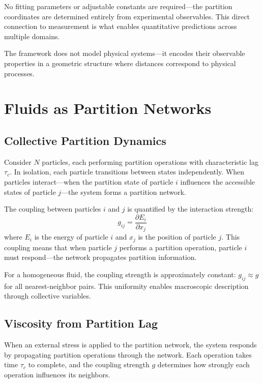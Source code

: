 \documentclass[twocolumn,superscriptaddress,prb,10pt]{revtex4-2}
\begin{document}
No fitting parameters or adjustable constants are required—the partition coordinates are determined entirely from experimental observables. This direct connection to measurement is what enables quantitative predictions across multiple domains.

The framework does not model physical systems—it encodes their observable properties in a geometric structure where distances correspond to physical processes.

\section{Fluids as Partition Networks}
\label{sec:fluids}

\subsection{Collective Partition Dynamics}

Consider $N$ particles, each performing partition operations with characteristic lag $\tau_c$. In isolation, each particle transitions between states independently. When particles interact—when the partition state of particle $i$ influences the accessible states of particle $j$—the system forms a partition network.

The coupling between particles $i$ and $j$ is quantified by the interaction strength:
\begin{equation}
g_{ij} = \frac{\partial E_i}{\partial x_j}
\label{eq:coupling}
\end{equation}
where $E_i$ is the energy of particle $i$ and $x_j$ is the position of particle $j$. This coupling means that when particle $j$ performs a partition operation, particle $i$ must respond—the network propagates partition information.

For a homogeneous fluid, the coupling strength is approximately constant: $g_{ij} \approx g$ for all nearest-neighbor pairs. This uniformity enables macroscopic description through collective variables.

\subsection{Viscosity from Partition Lag}

When an external stress is applied to the partition network, the system responds by propagating partition operations through the network. Each operation takes time $\tau_c$ to complete, and the coupling strength $g$ determines how strongly each operation influences its neighbors.
\end{document}

